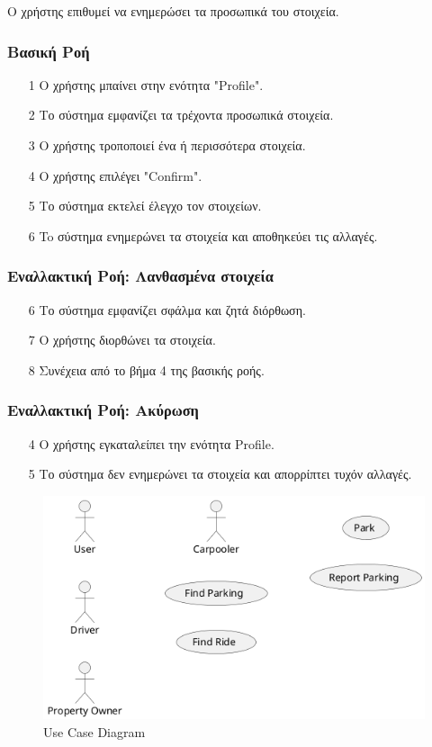 \documentclass[11pt]{article}
\begin{document}
Ο χρήστης επιθυμεί να ενημερώσει τα προσωπικά του στοιχεία.

\subsubsection{Βασική Ροή}

\begin{enumerate}
    \item[1] Ο χρήστης μπαίνει στην ενότητα "Profile".
    \item[2] Το σύστημα εμφανίζει τα τρέχοντα προσωπικά στοιχεία.
    \item[3] Ο χρήστης τροποποιεί ένα ή περισσότερα στοιχεία.
    \item[4] Ο χρήστης επιλέγει "Confirm".
    \item[5] Το σύστημα εκτελεί έλεγχο τον στοιχείων.
    \item[6] To σύστημα ενημερώνει τα στοιχεία και αποθηκεύει τις αλλαγές.
\end{enumerate}

\subsubsection{Εναλλακτική Ροή: Λανθασμένα στοιχεία}

\begin{enumerate}
    \item[6] Το σύστημα εμφανίζει σφάλμα και ζητά διόρθωση.
    \item[7] Ο χρήστης διορθώνει τα στοιχεία.
    \item[8] Συνέχεια από το βήμα 4 της βασικής ροής.
\end{enumerate}

\subsubsection{Εναλλακτική Ροή: Ακύρωση}

\begin{enumerate}
    \item[4] Ο χρήστης εγκαταλείπει την ενότητα Profile.
    \item[5] Το σύστημα δεν ενημερώνει τα στοιχεία και απορρίπτει τυχόν αλλαγές.
\end{enumerate}

\begin{figure}
    \centering
    \includegraphics[width=\textwidth]{use-cases}
    \caption{Use Case Diagram}
\end{figure}
\end{document}
